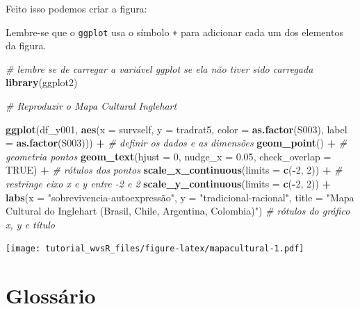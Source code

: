\documentclass[
  10pt,
  brazil,
  a4paper,
  twoside, notitlepage, openright]{book}
\newenvironment{Shaded}{\begin{snugshade}}{\end{snugshade}}
\newcommand{\CommentTok}[1]{\textcolor[rgb]{0.56,0.35,0.01}{\textit{#1}}}
\newcommand{\DataTypeTok}[1]{\textcolor[rgb]{0.13,0.29,0.53}{#1}}
\newcommand{\DecValTok}[1]{\textcolor[rgb]{0.00,0.00,0.81}{#1}}
\newcommand{\FloatTok}[1]{\textcolor[rgb]{0.00,0.00,0.81}{#1}}
\newcommand{\KeywordTok}[1]{\textcolor[rgb]{0.13,0.29,0.53}{\textbf{#1}}}
\newcommand{\NormalTok}[1]{#1}
\newcommand{\OperatorTok}[1]{\textcolor[rgb]{0.81,0.36,0.00}{\textbf{#1}}}
\newcommand{\OtherTok}[1]{\textcolor[rgb]{0.56,0.35,0.01}{#1}}
\newcommand{\StringTok}[1]{\textcolor[rgb]{0.31,0.60,0.02}{#1}}
\begin{document}
Feito isso podemos criar a figura:

Lembre-se que o \texttt{ggplot} usa o símbolo \texttt{+} para adicionar cada um dos elementos da figura.

\begin{Shaded}
\begin{Highlighting}[]
\CommentTok{# lembre se de carregar a variável ggplot se ela não tiver sido carregada }
\KeywordTok{library}\NormalTok{(ggplot2)}

\CommentTok{# Reproduzir o Mapa Cultural Inglehart}

\KeywordTok{ggplot}\NormalTok{(df_y001, }\KeywordTok{aes}\NormalTok{(}\DataTypeTok{x =}\NormalTok{ survself, }
                    \DataTypeTok{y =}\NormalTok{ tradrat5, }
                    \DataTypeTok{color =} \KeywordTok{as.factor}\NormalTok{(S003), }
                    \DataTypeTok{label =} \KeywordTok{as.factor}\NormalTok{(S003))) }\OperatorTok{+}\StringTok{ }
\StringTok{  }\CommentTok{# definir os dados e as dimensões}
\StringTok{  }\KeywordTok{geom_point}\NormalTok{() }\OperatorTok{+}\StringTok{ }\CommentTok{# geometria pontos}
\StringTok{  }\KeywordTok{geom_text}\NormalTok{(}\DataTypeTok{hjust =} \DecValTok{0}\NormalTok{, }\DataTypeTok{nudge_x =} \FloatTok{0.05}\NormalTok{, }\DataTypeTok{check_overlap =} \OtherTok{TRUE}\NormalTok{) }\OperatorTok{+}\StringTok{ }\CommentTok{# rótulos dos pontos}
\StringTok{  }\KeywordTok{scale_x_continuous}\NormalTok{(}\DataTypeTok{limits =} \KeywordTok{c}\NormalTok{(}\OperatorTok{-}\DecValTok{2}\NormalTok{, }\DecValTok{2}\NormalTok{)) }\OperatorTok{+}\StringTok{ }\CommentTok{# restringe eixo x e y entre -2 e 2}
\StringTok{  }\KeywordTok{scale_y_continuous}\NormalTok{(}\DataTypeTok{limits =} \KeywordTok{c}\NormalTok{(}\OperatorTok{-}\DecValTok{2}\NormalTok{, }\DecValTok{2}\NormalTok{)) }\OperatorTok{+}
\StringTok{  }\KeywordTok{labs}\NormalTok{(}\DataTypeTok{x =} \StringTok{"sobrevivencia-autoexpressão"}\NormalTok{,}
       \DataTypeTok{y =} \StringTok{"tradicional-racional"}\NormalTok{,}
       \DataTypeTok{title =} \StringTok{"Mapa Cultural do Inglehart (Brasil, Chile, Argentina, Colombia)"}\NormalTok{) }\CommentTok{# rótulos do gráfico x, y e título}
\end{Highlighting}
\end{Shaded}

\texttt{[image: tutorial\_wvsR\_files/figure-latex/mapacultural-1.pdf]}

\hypertarget{glossuxe1rio}{%
\chapter{Glossário}\label{glossuxe1rio}}
\end{document}
